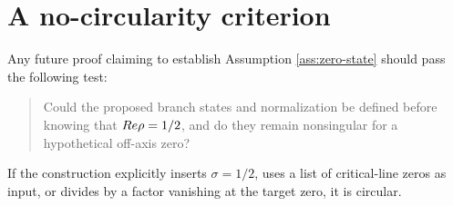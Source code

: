 \section{A no-circularity criterion}
Any future proof claiming to establish Assumption \ref{ass:zero-state} should pass the following test:
\begin{quote}
Could the proposed branch states and normalization be defined before knowing that $Re\rho=1/2$, and do they remain nonsingular for a hypothetical off-axis zero?
\end{quote}
If the construction explicitly inserts $\sigma=1/2$, uses a list of critical-line zeros as input, or divides by a factor vanishing at the target zero, it is circular.
